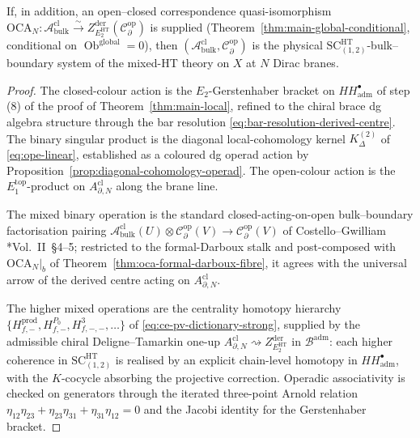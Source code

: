 \begin{thm}
If, in addition, an open--closed correspondence quasi-isomorphism
\(\mathrm{OCA}_N\colon\mathcal A^{\mathrm{cl}}_{\mathrm{bulk}}
\xrightarrow{\sim}Z^{\mathrm{der}}_{E_2^{\mathrm{HT}}}(
\mathcal C^{\mathrm{op}}_\partial)\)
is supplied (Theorem~\ref{thm:main-global-conditional}, conditional
on \(\operatorname{Ob}^{\mathrm{global}}=0\)), then
\((\mathcal A^{\mathrm{cl}}_{\mathrm{bulk}},
\mathcal C^{\mathrm{op}}_\partial)\) is the physical
\(\mathrm{SC}^{\mathrm{HT}}_{(1,2)}\)-bulk--boundary system of the
mixed-HT theory on \(X\) at \(N\) Dirac branes.
\end{thm}

\begin{proof}
The closed-colour action is the \(E_2\)-Gerstenhaber bracket on
\(HH^\bullet_{\mathrm{adm}}\) of step (8) of the proof of
Theorem~\ref{thm:main-local}, refined to the chiral brace dg algebra
structure through the bar resolution
\eqref{eq:bar-resolution-derived-centre}.  The binary singular product
is the diagonal local-cohomology kernel \(K^{(2)}_\Delta\) of
\eqref{eq:ope-linear}, established as a coloured dg operad action by
Proposition~\ref{prop:diagonal-cohomology-operad}.  The open-colour
action is the \(E_1^{\mathrm{top}}\)-product on
\(A^{\mathrm{cl}}_{\partial,N}\) along the brane line.

The mixed binary operation is the standard closed-acting-on-open
bulk--boundary factorisation pairing
\(\mathcal A^{\mathrm{cl}}_{\mathrm{bulk}}(U)\otimes
\mathcal C^{\mathrm{op}}_\partial(V)\to
\mathcal C^{\mathrm{op}}_\partial(V)\) of
Costello--Gwilliam \cite{costello-gwilliam}*{Vol.~II~\S 4--5};
restricted to the formal-Darboux stalk and post-composed with
\(\mathrm{OCA}_N|_b\) of
Theorem~\ref{thm:oca-formal-darboux-fibre}, it agrees with the
universal arrow of the derived centre acting on
\(A^{\mathrm{cl}}_{\partial,N}\).

The higher mixed operations are the centrality homotopy hierarchy
\(\{H^{\mathrm{prod}}_{f,-},H^{P_0}_{f,-},H^3_{f,-,-},\ldots\}\) of
\eqref{eq:ce-pv-dictionary-strong}, supplied by the admissible chiral
Deligne--Tamarkin one-up
\(A^{\mathrm{cl}}_{\partial,N}\rightsquigarrow
Z^{\mathrm{der}}_{E_2^{\mathrm{HT}}}\) in \(\mathcal B^{\mathrm{adm}}\):
each higher coherence in
\(\mathrm{SC}^{\mathrm{HT}}_{(1,2)}\) is realised by an explicit
chain-level homotopy in \(HH^\bullet_{\mathrm{adm}}\), with the
\(K\)-cocycle absorbing the projective correction.  Operadic
associativity is checked on generators through the iterated
three-point Arnold relation
\(\eta_{12}\eta_{23}+\eta_{23}\eta_{31}+\eta_{31}\eta_{12}=0\) and the
Jacobi identity for the Gerstenhaber bracket.


\end{proof}
